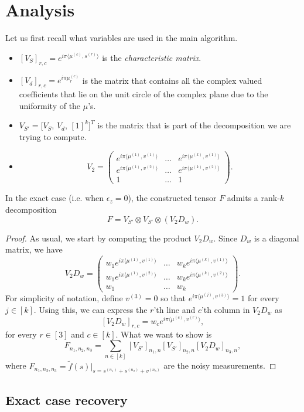\section{Analysis}
Let us first recall what variables are used in the main algorithm.
\begin{itemize}
    \item $[V_S]_{r,c}=e^{i\pi\langle\mu^{(c)},s^{(r)}\rangle}$ is the \textit{characteristic matrix}.
    \item $[V_d]_{r,c}=e^{i\pi\mu_r^{(c)}}$ is the matrix that contains all the complex valued coefficients that lie on the unit circle of the complex plane due to the uniformity of the $\mu$'s.
    \item $V_{S'}=\big[V_S,\, V_d,\, [1]^k\big]^T$ is the matrix that is part of the decomposition we are trying to compute.
    \item $$V_2=
    \begin{pmatrix}
        e^{i\pi\langle\mu^{(1)},v^{(1)}\rangle}&\ldots&e^{i\pi\langle\mu^{(k)},v^{(1)}\rangle}\\
        e^{i\pi\langle\mu^{(1)},v^{(2)}\rangle}&\ldots&e^{i\pi\langle\mu^{(k)},v^{(2)}\rangle}\\
        1&\ldots&1
    \end{pmatrix}.$$
\end{itemize}
\begin{fact}
    In the exact case (i.e. when $\epsilon_z=0$), the constructed tensor $F$ admits a rank-$k$ decomposition $$F=V_{S'}\otimes V_{S'}\otimes (V_2D_w).$$
\end{fact}
\begin{proof}
    As usual, we start by computing the product $V_2D_w$. Since $D_w$ is a diagonal matrix, we have $$V_2D_w=
    \begin{pmatrix}
        w_1e^{i\pi\langle\mu^{(1)},v^{(1)}\rangle}&\ldots&w_ke^{i\pi\langle\mu^{(k)},v^{(1)}\rangle}\\
        w_1e^{i\pi\langle\mu^{(1)},v^{(2)}\rangle}&\ldots&w_ke^{i\pi\langle\mu^{(k)},v^{(2)}\rangle}\\
        w_1&\ldots&w_k
    \end{pmatrix}.$$
    For simplicity of notation, define $v^{(3)}=0$ so that $e^{i\pi\langle\mu^{(j)},v^{(3)}\rangle}=1$ for every $j\in[k]$. Using this, we can express the $r$'th line and $c$'th column in $V_2D_w$ as $$[V_2D_w]_{r,c}=w_ce^{i\pi\langle\mu^{(c)},v^{(r)}\rangle},$$ for every $r\in[3]$ and $c\in[k]$. What we want to show is $$F_{n_1,n_2,n_3}=\sum_{n\in[k]}[V_{S'}]_{n_1,n}[V_{S'}]_{n_2,n}[V_2D_w]_{n_3,n},$$ where $F_{n_1,n_2,n_3}=\tilde{f}(s)\big|_{s=s^{(n_1)}+s^{(n_2)}+v^{(n_3)}}$ are the noisy measurements.
\end{proof}
\subsection{Exact case recovery}
